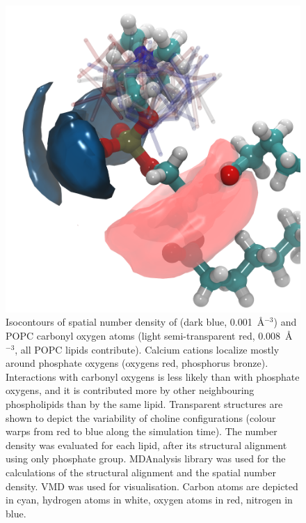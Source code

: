 \begin{figure}[tb!] 
  \centering 
  \includegraphics[width=\figwidth]{../img/ecc_popc/isocontours_r37_ca_O-carb.png} 
  \caption{\label{fig:volmaps} 
    Isocontours of spatial number density of  (dark blue, 0.001~Å$^{-3}$) 
    and POPC carbonyl oxygen atoms (light semi-transparent red, 0.008~Å$^{-3}$, all POPC lipids contribute). 
    Calcium cations localize mostly around phosphate oxygens (oxygens red, phosphorus bronze).
    Interactions with carbonyl oxygens is less likely than with phosphate oxygens, 
    and it is contributed more by other neighbouring phospholipids than by the same lipid. 
    Transparent structures are shown to depict the variability of choline configurations 
    (colour warps from red to blue along the simulation time). 
    The number density was evaluated for each lipid, 
    after its structural alignment using only phosphate group.
    MDAnalysis \citep{mdanalysis2011} library was used for 
    the calculations of the structural alignment and the spatial number density. 
    VMD \citep{hump96} was used for visualisation. 
    Carbon atoms are depicted in cyan, hydrogen atoms in white, oxygen atoms in red, nitrogen in blue.
  } 
\end{figure} 



